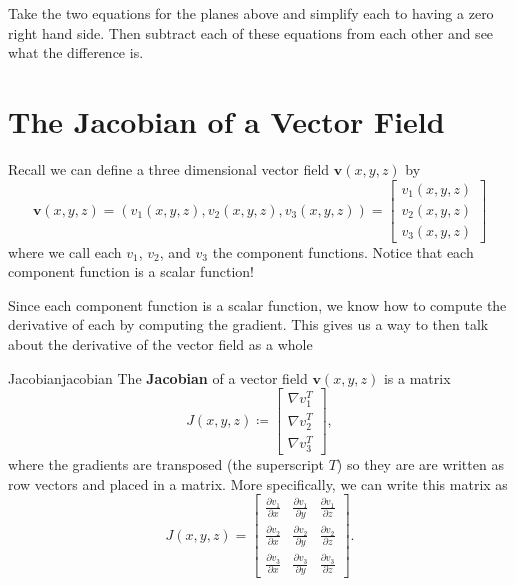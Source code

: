         \begin{exercise}
        Take the two equations for the planes above and simplify each to having a zero right hand side.  Then subtract each of these equations from each other and see what the difference is.
        \end{exercise}
        
        
        \section{The Jacobian of a Vector Field}
        Recall we can define a three dimensional vector field $\mathbf{v}(x,y,z)$ by
        \[
        \mathbf{v}(x,y,z)=(v_1(x,y,z),v_2(x,y,z),v_3(x,y,z)) = \begin{bmatrix} v_1(x,y,z) \\ v_2(x,y,z) \\ v_3(x,y,z) \end{bmatrix}
        \]
        where we call each $v_1$, $v_2$, and $v_3$ the component functions.  Notice that each component function is a scalar function!
        
        Since each component function is a scalar function, we know how to compute the derivative of each by computing the gradient.  This gives us a way to then talk about the derivative of the vector field as a whole
        
        \begin{df}{Jacobian}{jacobian}
        The \textbf{Jacobian} of a vector field $\mathbf{v}(x,y,z)$ is a matrix
        \[
        J(x,y,z)\coloneqq \begin{bmatrix} \nabla v_1^T \\ \nabla v_2^T \\ \nabla v_3^T \end{bmatrix},
        \]
        where the gradients are transposed (the superscript $T$) so they are are written as row vectors and placed in a matrix. More specifically, we can write this matrix as 
        \[
        J(x,y,z) = \begin{bmatrix} \frac{\partial v_1}{\partial x} & \frac{\partial v_1}{\partial y} & \frac{\partial v_1}{\partial z}\\ \frac{\partial v_2}{\partial x} & \frac{\partial v_2}{\partial y} & \frac{\partial v_2}{\partial z} \\ \frac{\partial v_3}{\partial x} & \frac{\partial v_3}{\partial y} & \frac{\partial v_3}{\partial z} \end{bmatrix}.
        \]
        \end{df}
        

